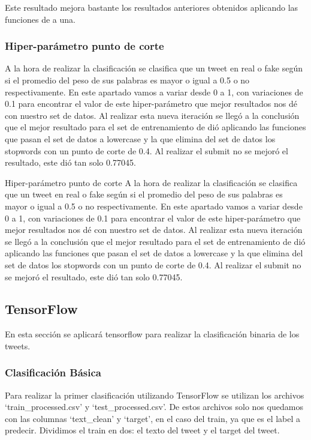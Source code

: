 \documentclass[12pt]{article}
\begin{document}
Este resultado mejora bastante los resultados anteriores obtenidos aplicando las funciones de a una.


\subsubsection{Hiper-parámetro punto de corte}
A la hora de realizar la clasificación se clasifica que un tweet en real o fake según si el promedio del peso de sus palabras es mayor o igual a 0.5 o no respectivamente.
En este apartado vamos a variar desde 0 a 1, con variaciones de 0.1 para encontrar el valor de este hiper-parámetro que mejor resultados nos dé con nuestro set de datos.
Al realizar esta nueva iteración se llegó a la conclusión que el mejor resultado para el set de entrenamiento de dió aplicando las funciones que pasan el set de datos a lowercase y la que elimina del set de datos los stopwords con un punto de corte de 0.4. Al realizar el submit no se mejoró el resultado, este dió tan solo 0.77045.

Hiper-parámetro punto de corte
A la hora de realizar la clasificación se clasifica que un tweet en real o fake según si el promedio del peso de sus palabras es mayor o igual a 0.5 o no respectivamente.
En este apartado vamos a variar desde 0 a 1, con variaciones de 0.1 para encontrar el valor de este hiper-parámetro que mejor resultados nos dé con nuestro set de datos.
Al realizar esta nueva iteración se llegó a la conclusión que el mejor resultado para el set de entrenamiento de dió aplicando las funciones que pasan el set de datos a lowercase y la que elimina del set de datos los stopwords con un punto de corte de 0.4. Al realizar el submit no se mejoró el resultado, este dió tan solo 0.77045.


\newpage
\subsection{TensorFlow}
En esta sección se aplicará tensorflow para realizar la clasificación binaria de los tweets.


\subsubsection{Clasificación Básica}
Para realizar la primer clasificación utilizando TensorFlow se utilizan los archivos ‘train\_processed.csv’ y ‘test\_processed.csv’.
De estos archivos solo nos quedamos con las columnas ‘text\_clean’ y ‘target’, en el caso del train, ya que es el label a predecir.
Dividimos el train en dos: el texto del tweet y el target del tweet.
\end{document}
